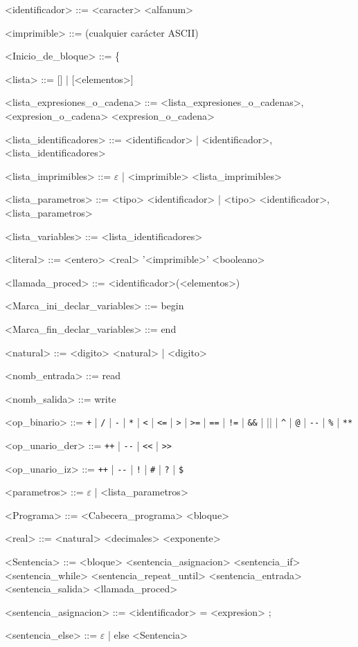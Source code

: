 \begin{grammar}
<identificador> ::= <caracter> <alfanum>

<imprimible> ::= (cualquier carácter ASCII)

<Inicio_de_bloque> ::= \{

<lista> ::= [] | [<elementos>]

<lista_expresiones_o_cadena> ::= <lista_expresiones_o_cadenas>, <expresion_o_cadena>
\alt <expresion_o_cadena>

<lista_identificadores> ::= <identificador> | <identificador>, <lista_identificadores>

<lista_imprimibles> ::= $\varepsilon$ | <imprimible> <lista_imprimibles>

<lista_parametros> ::= <tipo> <identificador> | <tipo> <identificador>, <lista_parametros>

<lista_variables> ::= <lista_identificadores>

<literal> ::= <entero>
\alt <real>
\alt '<imprimible>'
\alt <booleano>

<llamada_proced> ::= <identificador>(<elementos>)

<Marca_ini_declar_variables> ::= begin

<Marca_fin_declar_variables> ::= end

<natural> ::= <digito> <natural> | <digito>

<nomb_entrada> ::= read

<nomb_salida> ::= write

<op_binario> ::= \verb|+| | \verb|/| | \verb|-| | \verb|*| | \verb|<| | \verb|<=| | \verb|>| | \verb|>=| | \verb|==| | \verb|!=| | \verb|&&| | \verb|||| | \verb|^| | \verb|@| | \verb|--| | \verb|%| | \verb|**|

<op_unario_der> ::= \verb|++| | \verb|--| | \verb|<<| | \verb|>>|

<op_unario_iz> ::= \verb|++| | \verb|--| | \verb|!| | \verb|#| | \verb|?| | \verb|$|

<parametros> ::= $\varepsilon$ | <lista_parametros>

<Programa> ::= <Cabecera_programa> <bloque>

<real> ::= <natural> <decimales> <exponente>

<Sentencia> ::= <bloque>
\alt <sentencia_asignacion>
\alt <sentencia_if>
\alt <sentencia_while>
\alt <sentencia_repeat_until>
\alt <sentencia_entrada>
\alt <sentencia_salida>
\alt <llamada_proced>

<sentencia_asignacion> ::=  <identificador> = <expresion> ;

<sentencia_else> ::= $\varepsilon$ | else <Sentencia>


\end{grammar}
